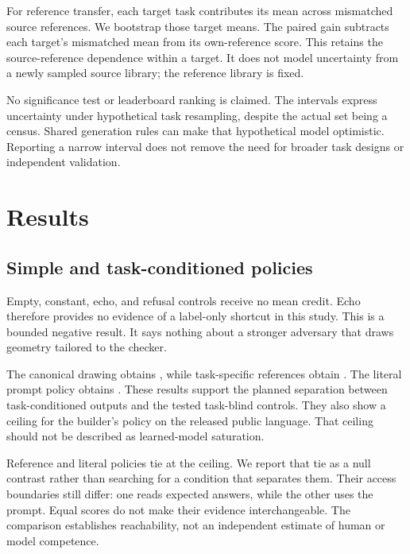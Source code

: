\documentclass{article}
\begin{document}
For reference transfer, each target task contributes its mean across mismatched source references. We bootstrap those target means. The paired gain subtracts each target's mismatched mean from its own-reference score. This retains the source-reference dependence within a target. It does not model uncertainty from a newly sampled source library; the reference library is fixed.

No significance test or leaderboard ranking is claimed. The intervals express uncertainty under hypothetical task resampling, despite the actual set being a census. Shared generation rules can make that hypothetical model optimistic. Reporting a narrow interval does not remove the need for broader task designs or independent validation.

\section{Results}
\subsection{Simple and task-conditioned policies}
\begin{table}[ht]\centering\small\caption{Scripted control results. Mean intervals use task bootstrap; success intervals use Wilson. Success means a returned score at least $0.8$.}\end{table}
Empty, constant, echo, and refusal controls receive no mean credit. Echo therefore provides no evidence of a label-only shortcut in this study. This is a bounded negative result. It says nothing about a stronger adversary that draws geometry tailored to the checker.

The canonical drawing obtains \canonicalMean{}, while task-specific references obtain . The literal prompt policy obtains \literalMean{}. These results support the planned separation between task-conditioned outputs and the tested task-blind controls. They also show a ceiling for the builder's policy on the released public language. That ceiling should not be described as learned-model saturation.


Reference and literal policies tie at the ceiling. We report that tie as a null contrast rather than searching for a condition that separates them. Their access boundaries still differ: one reads expected answers, while the other uses the prompt. Equal scores do not make their evidence interchangeable. The comparison establishes reachability, not an independent estimate of human or model competence.
\end{document}
